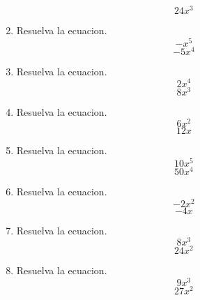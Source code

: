 \documentclass[12pt]{article}%
\begin{document}
\begin{enumerate}[wide, labelwidth=!, labelindent=0pt,label={Pregunta \arabic*. }]
\begin{equation*}24 x^{3}\end{equation*}%
\item%
%
Resuelva la ecuacion.%
\begin{equation*}- x^{5}\end{equation*}%
\begin{equation*}- 5 x^{4}\end{equation*}%
\item%
%
Resuelva la ecuacion.%
\begin{equation*}2 x^{4}\end{equation*}%
\begin{equation*}8 x^{3}\end{equation*}%
\item%
%
Resuelva la ecuacion.%
\begin{equation*}6 x^{2}\end{equation*}%
\begin{equation*}12 x\end{equation*}%
\item%
%
Resuelva la ecuacion.%
\begin{equation*}10 x^{5}\end{equation*}%
\begin{equation*}50 x^{4}\end{equation*}%
\item%
%
Resuelva la ecuacion.%
\begin{equation*}- 2 x^{2}\end{equation*}%
\begin{equation*}- 4 x\end{equation*}%
\item%
%
Resuelva la ecuacion.%
\begin{equation*}8 x^{3}\end{equation*}%
\begin{equation*}24 x^{2}\end{equation*}%
\item%
%
Resuelva la ecuacion.%
\begin{equation*}9 x^{3}\end{equation*}%
\begin{equation*}27 x^{2}\end{equation*}%
\end{enumerate}%
\end{document}
